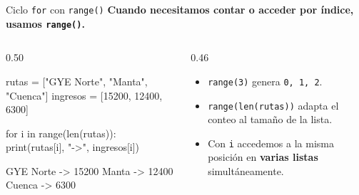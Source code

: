 \documentclass[aspectratio=169, 11pt]{beamer}
\begin{document}
\begin{frame}[fragile,shrink=30]{Ciclo \texttt{for} con \texttt{range()}}
  \vspace{-6pt}
  {\small\color{arcaDark}\bfseries
    Cuando necesitamos contar o acceder por índice,
    usamos \texttt{range()}.}

  \vspace{4pt}
  \begin{columns}[T]
    \begin{column}{0.50\textwidth}
      \begin{pyblock}
rutas    = ["GYE Norte", "Manta", "Cuenca"]
ingresos = [15200, 12400, 6300]

for i in range(len(rutas)):
    print(rutas[i], "->", ingresos[i])
      \end{pyblock}
      \vspace{-2pt}
      \begin{outputblock}
GYE Norte -> 15200
Manta -> 12400
Cuenca -> 6300
      \end{outputblock}
    \end{column}

    \begin{column}{0.46\textwidth}
      {\footnotesize\color{textMuted}
      \begin{itemize}\setlength{\itemsep}{5pt}
        \item[{\color{arcaRed}\scriptsize\faArrowRight}]
          \texttt{range(3)} genera \texttt{0, 1, 2}.
        \item[{\color{arcaRed}\scriptsize\faArrowRight}]
          \texttt{range(len(rutas))} adapta
          el conteo al tamaño de la lista.
        \item[{\color{arcaRed}\scriptsize\faArrowRight}]
          Con \texttt{i} accedemos a la misma
          posición en \textbf{varias listas}
          simultáneamente.
      \end{itemize}
      }
    \end{column}
  \end{columns}
\end{frame}
\end{document}

